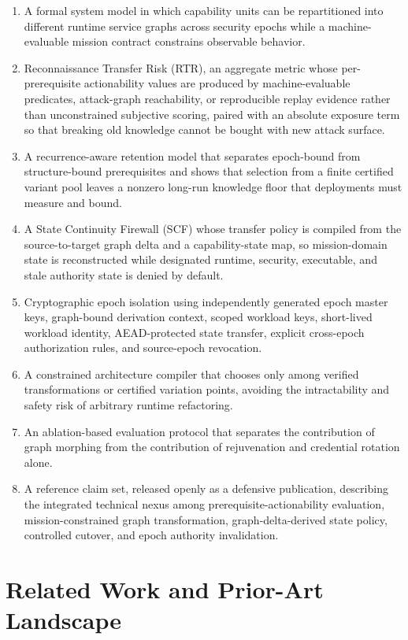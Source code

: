 \documentclass[11pt,letterpaper]{article}
\begin{document}
\begin{enumerate}[leftmargin=2em,itemsep=2pt]
\item A formal system model in which capability units can be repartitioned into different runtime service graphs across security epochs while a machine-evaluable mission contract constrains observable behavior.
\item Reconnaissance Transfer Risk (RTR), an aggregate metric whose per-prerequisite actionability values are produced by machine-evaluable predicates, attack-graph reachability, or reproducible replay evidence rather than unconstrained subjective scoring, paired with an absolute exposure term so that breaking old knowledge cannot be bought with new attack surface.
\item A recurrence-aware retention model that separates epoch-bound from structure-bound prerequisites and shows that selection from a finite certified variant pool leaves a nonzero long-run knowledge floor that deployments must measure and bound.
\item A State Continuity Firewall (SCF) whose transfer policy is compiled from the source-to-target graph delta and a capability-state map, so mission-domain state is reconstructed while designated runtime, security, executable, and stale authority state is denied by default.
\item Cryptographic epoch isolation using independently generated epoch master keys, graph-bound derivation context, scoped workload keys, short-lived workload identity, AEAD-protected state transfer, explicit cross-epoch authorization rules, and source-epoch revocation.
\item A constrained architecture compiler that chooses only among verified transformations or certified variation points, avoiding the intractability and safety risk of arbitrary runtime refactoring.
\item An ablation-based evaluation protocol that separates the contribution of graph morphing from the contribution of rejuvenation and credential rotation alone.
\item A reference claim set, released openly as a defensive publication, describing the integrated technical nexus among prerequisite-actionability evaluation, mission-constrained graph transformation, graph-delta-derived state policy, controlled cutover, and epoch authority invalidation.
\end{enumerate}

\section{Related Work and Prior-Art Landscape}
\end{document}
